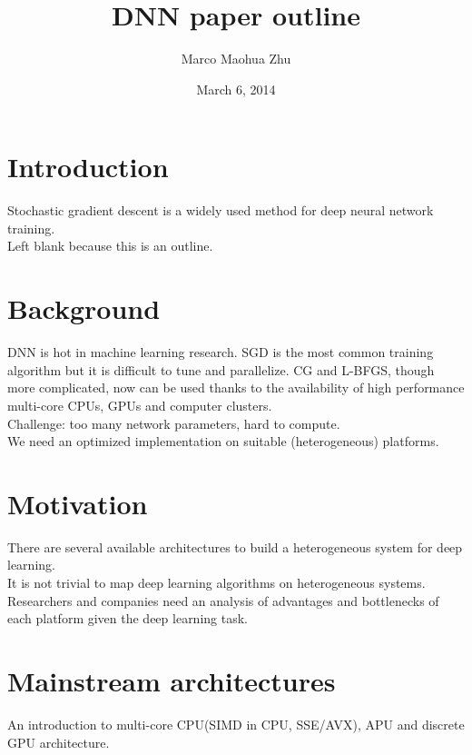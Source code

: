 

\title{DNN paper outline}
\author{Marco Maohua Zhu}
\date{March 6, 2014}

\maketitle
\acmblank{}



\section{Introduction}

Stochastic gradient descent is a widely used method for deep neural network training. \cite{QuocLe2011} \\
Left blank because this is an outline.

\section{Background}

DNN is hot in machine learning research. SGD is the most common training algorithm but it is difficult to tune and parallelize. CG and L-BFGS, though more complicated, now can be used thanks to the availability of high performance multi-core CPUs, GPUs and computer clusters.\\
Challenge: too many network parameters, hard to compute.\\
We need an optimized implementation on suitable (heterogeneous) platforms.

\section{Motivation}

There are several available architectures to build a heterogeneous system for deep learning.\\
It is not trivial to map deep learning algorithms on heterogeneous systems.\\
Researchers and companies need an analysis of advantages and bottlenecks of each platform given the deep learning task.

\section{Mainstream architectures}

An introduction to multi-core CPU(SIMD in CPU, SSE/AVX), APU and discrete GPU architecture.


